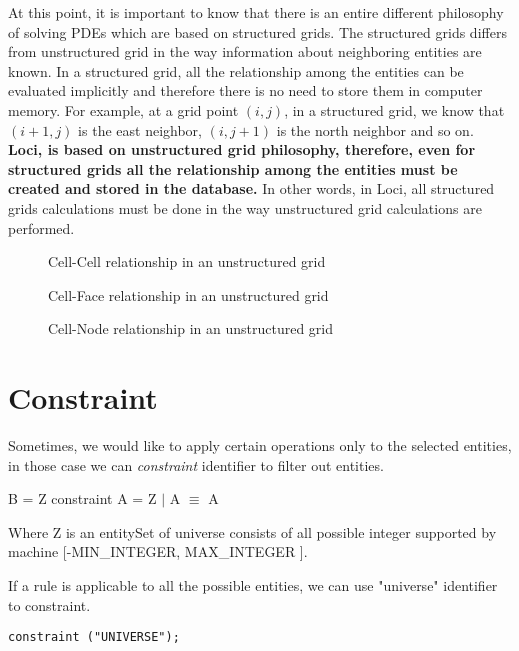 \par At this point, it is important to know that there is an entire different
philosophy of solving PDEs which are based on structured grids. The structured
grids differs from unstructured grid in the way information about neighboring
entities are known. In a structured grid, all the relationship among the
entities can be evaluated implicitly and therefore there is no need to store
them in computer memory. For example, at a grid point $(i,j)$, in a structured
grid, we know that $(i+1,j)$ is the east neighbor, $(i,j+1)$ is the north
neighbor and so on. {\bf Loci, is based on unstructured grid philosophy,
therefore, even for structured grids all the relationship among the entities
must be created and stored in the database.} In other words, in Loci, all 
structured grids calculations must be done in the way unstructured grid
calculations are performed.


\begin{figure}[ht]
\vspace{2.80in} \caption {Cell-Cell relationship in an unstructured grid}
\vspace{2.90in} \caption { Cell-Face relationship in an unstructured grid}
\vspace{3.00in} \caption { Cell-Node relationship in an unstructured grid}
\end{figure}
%
\section {Constraint}
Sometimes, we would like to apply certain operations only to the selected entities, 
in those case we can {\em constraint} identifier to filter out entities.

\begin {center}
B = Z constraint A = Z $\mid $ A $\equiv $ A
\end {center}

\par Where Z is an entitySet of universe consists of all possible integer
supported by machine [-MIN\_INTEGER, MAX\_INTEGER ].

If a rule is applicable to all the possible entities, we can use "universe"
identifier to constraint.

\begin{verbatim}
constraint ("UNIVERSE");
\end{verbatim}

